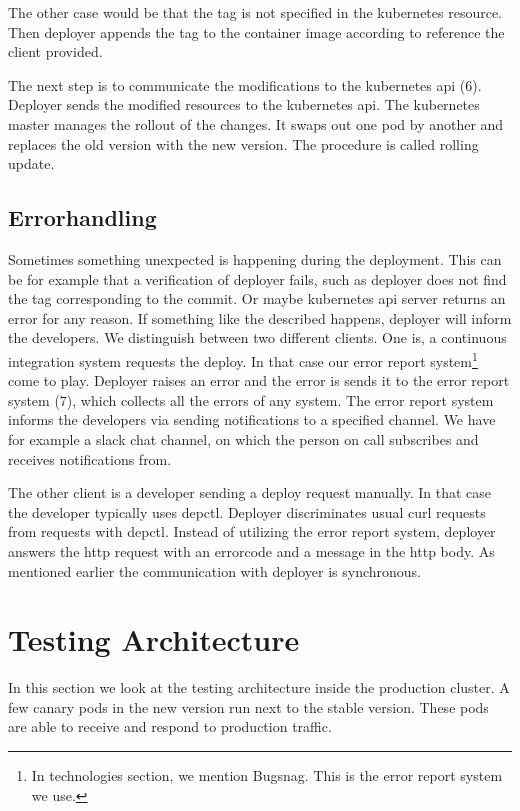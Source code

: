 The other case would be that the tag is not specified in the kubernetes resource. Then
deployer appends the tag to the container image according to reference the client provided.

The next step is to communicate the modifications to the kubernetes api (6). Deployer
sends the modified resources to the kubernetes api. The kubernetes master manages the
rollout of the changes. It swaps out one pod by another and replaces the old version with
the new version. The procedure is called rolling update.

\subsection{Errorhandling}

Sometimes something unexpected is happening during the deployment. This can be for example
that a verification of deployer fails, such as deployer does not find the tag
corresponding to the commit. Or maybe kubernetes api server returns an error for any
reason. If something like the described happens, deployer will inform the developers. We
distinguish between two different clients. One is, a continuous integration system
requests the deploy. In that case our error report system\footnote{In technologies
  section, we mention Bugsnag. This is the error report system we use.} come to
play. Deployer raises an error and the error is sends it to the error report system (7),
which collects all the errors of any system. The error report system informs the
developers via sending notifications to a specified channel. We have for example a slack
chat channel, on which the person on call subscribes and receives notifications from.

The other client is a developer sending a deploy request manually. In that case the
developer typically uses depctl. Deployer discriminates usual curl requests from requests
with depctl. Instead of utilizing the error report system, deployer answers the http
request with an errorcode and a message in the http body. As mentioned earlier the
communication with deployer is synchronous.

\section{Testing Architecture}

In this section we look at the testing architecture inside the production cluster. A few
canary pods in the new version run next to the stable version. These pods are able to
receive and respond to production traffic.

